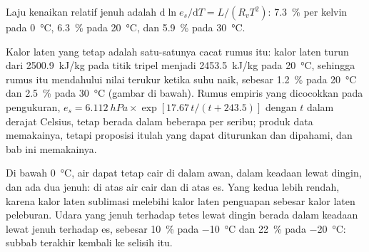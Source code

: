 \begin{corollary}\label{cor:b2:atmospheric-thermodynamics:seven}
Laju kenaikan relatif  jenuh adalah
$\mathrm{d}\ln e_s/\mathrm{d}T = L/(R_v T^2)$: \qty{7.3}{\percent} per kelvin pada
\qty{0}{\celsius}, \qty{6.3}{\percent} pada \qty{20}{\celsius}, dan \qty{5.9}{\percent} pada
\qty{30}{\celsius}.
\end{corollary}

Kalor laten yang tetap adalah satu-satunya cacat rumus itu: kalor laten turun dari
\qty{2500.9}{kJ/kg} pada titik tripel menjadi \qty{2453.5}{kJ/kg} pada \qty{20}{\celsius}, sehingga
rumus itu mendahului nilai terukur ketika suhu naik, sebesar \qty{1.2}{\percent} pada
\qty{20}{\celsius} dan \qty{2.5}{\percent} pada \qty{30}{\celsius} (gambar di bawah). Rumus
empiris yang dicocokkan pada pengukuran, $e_s = \qty{6.112}{hPa} \times \exp[17.67\,t/(t + 243.5)]$ dengan
$t$ dalam derajat Celsius, tetap berada dalam beberapa per seribu; produk data memakainya, tetapi
proposisi itulah yang dapat diturunkan dan dipahami, dan bab ini memakainya.

Di bawah \qty{0}{\celsius}, air dapat tetap cair di dalam awan, dalam keadaan lewat dingin, dan ada dua 
jenuh: di atas air cair dan di atas es. Yang kedua lebih rendah, karena kalor laten
sublimasi melebihi kalor laten penguapan sebesar kalor laten peleburan. Udara yang jenuh terhadap
tetes lewat dingin berada dalam keadaan lewat jenuh terhadap es, sebesar \qty{10}{\percent} pada
\qty{-10}{\celsius} dan \qty{22}{\percent} pada \qty{-20}{\celsius}: subbab terakhir kembali ke
selisih itu.

